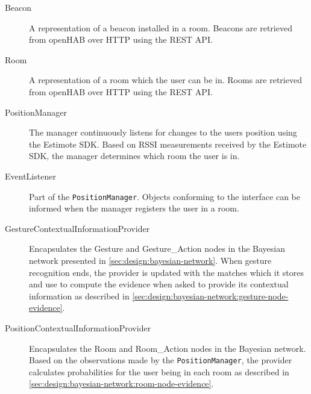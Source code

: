 \begin{description}
\item[Beacon] A representation of a beacon installed in a room. Beacons are retrieved from openHAB over HTTP using the REST API.
\item[Room] A representation of a room which the user can be in. Rooms are retrieved from openHAB over HTTP using the REST API.
\item[PositionManager] The manager continuously listens for changes to the users position using the Estimote SDK. Based on RSSI measurements received by the Estimote SDK, the manager determines which room the user is in.
\item[EventListener] Part of the \texttt{PositionManager}. Objects conforming to the interface can be informed when the manager registers the user in a room.
\item[GestureContextualInformationProvider] Encapsulates the Gesture and Gesture\_Action nodes in the Bayesian network presented in \cref{sec:design:bayesian-network}. When gesture recognition ends, the provider is updated with the matches which it stores and use to compute the evidence when asked to provide its contextual information as described in \cref{sec:design:bayesian-network:gesture-node-evidence}.
\item[PositionContextualInformationProvider] Encapsulates the Room and Room\_Action nodes in the Bayesian network. Based on the observations made by the \texttt{PositionManager}, the provider calculates probabilities for the user being in each room as described in \cref{sec:design:bayesian-network:room-node-evidence}.
\end{description}

